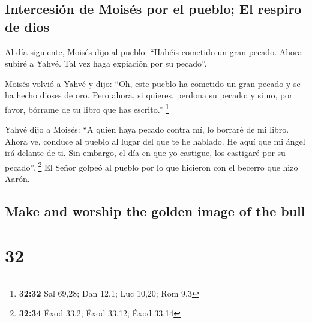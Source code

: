 \begin{paracol}{2}
\hypertarget{intercesiuxf3n-de-moisuxe9s-por-el-pueblo-el-respiro-de-dios}{%
\subsection{Intercesión de Moisés por el pueblo; El respiro de
dios}\label{intercesiuxf3n-de-moisuxe9s-por-el-pueblo-el-respiro-de-dios}}

 Al día siguiente, Moisés dijo al pueblo: ``Habéis
cometido un gran pecado. Ahora subiré a Yahvé. Tal vez haga expiación
por su pecado''.

 Moisés volvió a Yahvé y dijo: ``Oh, este pueblo ha
cometido un gran pecado y se ha hecho dioses de oro. 
Pero ahora, si quieres, perdona su pecado; y si no, por favor, bórrame
de tu libro que has escrito.'' \footnote{\textbf{32:32} Sal 69,28; Dan
  12,1; Luc 10,20; Rom 9,3}

 Yahvé dijo a Moisés: ``A quien haya pecado contra mí, lo
borraré de mi libro.  Ahora ve, conduce al pueblo al
lugar del que te he hablado. He aquí que mi ángel irá delante de ti. Sin
embargo, el día en que yo castigue, los castigaré por su pecado''.
\footnote{\textbf{32:34} Éxod 33,2; Éxod 33,12; Éxod 33,14}
 El Señor golpeó al pueblo por lo que hicieron con el
becerro que hizo Aarón.

\switchcolumn
\begin{otherlanguage}{english}

\hypertarget{make-and-worship-the-golden-image-of-the-bull}{%
\subsection{Make and worship the golden image of the
bull}\label{make-and-worship-the-golden-image-of-the-bull}}

\hypertarget{section-63}{%
\section{32}\label{section-63}}


\end{otherlanguage}
\end{paracol}
